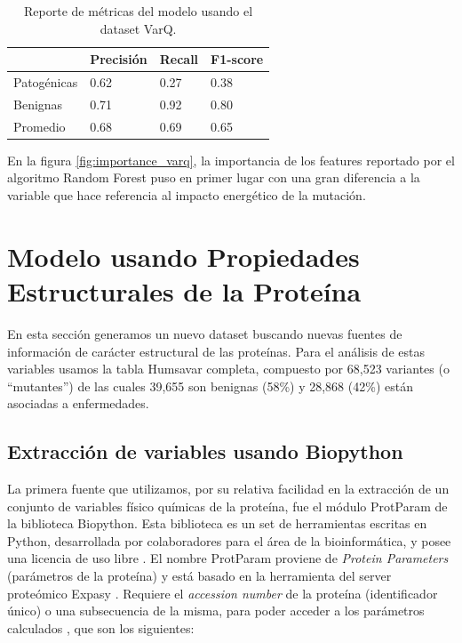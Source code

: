 \begin{table}[H]
\centering
\begin{tabular}{|l|l|l|l|}
\hline
              & Precisión & Recall & F1-score \\ \hline
Patogénicas   & 0.62      & 0.27   & 0.38     \\ \hline
Benignas      & 0.71      & 0.92   & 0.80     \\ \hline
Promedio      & 0.68      & 0.69   & 0.65     \\ \hline   
\end{tabular}
\caption{Reporte de métricas del modelo usando el dataset VarQ.}

\label{fig:metrics_varq}
\end{table}

En la figura \ref{fig:importance_varq}, la importancia de los features reportado por el algoritmo Random Forest puso en primer lugar con una gran diferencia a la variable que hace referencia al impacto energético de la mutación.  


\newpage

\section{Modelo usando Propiedades Estructurales de la Proteína}

En esta sección generamos un nuevo dataset buscando nuevas fuentes de información de carácter estructural de las proteínas. Para el análisis de estas variables usamos la tabla Humsavar completa, compuesto por 68,523 variantes (o ``mutantes'') de las cuales 39,655 son benignas (58\%) y 28,868 (42\%) están asociadas a enfermedades. 

\subsection{Extracción de variables usando Biopython}

La primera fuente que utilizamos, por su relativa facilidad en la extracción de un conjunto de variables físico químicas de la proteína, fue el módulo ProtParam de la biblioteca Biopython. Esta biblioteca es un set de herramientas escritas en Python, desarrollada por colaboradores para el área de la bioinformática, y posee una licencia de uso libre \todo{[ref]}.
El nombre ProtParam proviene de \textit{Protein Parameters} (parámetros de la proteína) y está basado en la herramienta del server proteómico Expasy \todo{[ref]}. Requiere el \textit{accession number} de la proteína (identificador único) o una subsecuencia de la misma, para poder acceder a los parámetros calculados \todo{[ref]}, que son los siguientes:

